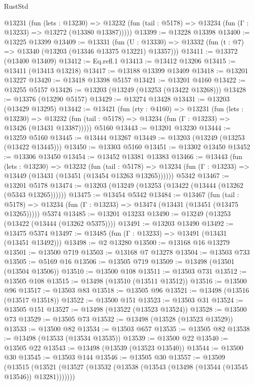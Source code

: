 \begin{lexlean}{RustStd}
\begin{coremodule}
    @13231
      (fun (lets : @13230) =>
      @13232 (fun (tail : @5178) => @13234 (fun (Γ : @13233) => @13272 (@13380 @13387)))))
@13399 := @13228 @13398
@13400 := @13225 @13399
@13409 := @13331
    (fun (U : @13330) => @13332 (fun (t : @7) => @13340 (@13203 (@13346 @13375 @13221) @13357)))
@13411 := @13372 (@13400 @13409)
@13412 := Eq.refl.{1}
@13413 := @13412 @13206
@13415 := @13411 (@13413 @13218)
@13417 := @13188 @13399 @13409
@13418 := @13201 @13227
@13420 := @13418 @13398 @5157
@13421 := @13201 @4160
@13422 := @13255 @5157
@13426 := @13203 (@13249 (@13253 (@13422 @13268)))
@13428 := @13376 (@13290 @5157)
@13429 := @13274 @13428
@13431 := @13203 (@13429 @13295)
@13442 := @13421
    (fun (rty : @4160) =>
    @13231
      (fun (lets : @13230) =>
      @13232 (fun (tail : @5178) => @13234 (fun (Γ : @13233) => @13426 (@13431 @13387)))))
    @5160
@13443 := @13201 @13230
@13444 := @13259 @5160
@13445 := @13444 @13267
@13449 := @13203 (@13249 (@13253 (@13422 @13445)))
@13450 := @13303 @5160
@13451 := @13302 @13450
@13452 := @13306 @13450
@13454 := @13452 @13381 @13383
@13466 := @13443
    (fun (lets : @13230) =>
    @13232
      (fun (tail : @5178) =>
      @13234 (fun (Γ : @13233) => @13449 (@13431 (@13451 (@13454 @13263 @13265))))))
    @5342
@13467 := @13201 @5178
@13474 := @13203 (@13249 (@13253 (@13422 (@13444 (@13262 (@5343 @13265))))))
@13475 := @13454 @5342
@13484 := @13467
    (fun (tail : @5178) => @13234 (fun (Γ : @13233) => @13474 (@13431 (@13451 (@13475 @13265)))))
    @5374
@13485 := @13201 @13233
@13490 := @13249 (@13253 (@13422 (@13444 (@13262 @5375))))
@13491 := @13203 @13490
@13492 := @13475 @5374
@13497 := @13485 (fun (Γ : @13233) => @13491 (@13431 (@13451 @13492)))
@13498 := @2 @13280
@13500 := @13168 @16 @13279
@13501 := @13500 @719
@13503 := @13168 @7 @13278
@13504 := @13503 @733
@13505 := @5169 @16
@13506 := @13505 @719
@13509 := @13498 (@13501 (@13504 @13506))
@13510 := @13500 @108
@13511 := @13503 @731
@13512 := @13505 @108
@13515 := @13498 (@13510 (@13511 @13512))
@13516 := @13500 @96
@13517 := @13503 @83
@13518 := @13505 @96
@13521 := @13498 (@13516 (@13517 @13518))
@13522 := @13500 @151
@13523 := @13503 @31
@13524 := @13505 @151
@13527 := @13498 (@13522 (@13523 @13524))
@13528 := @13500 @73
@13529 := @13505 @73
@13532 := @13498 (@13528 (@13523 @13529))
@13533 := @13500 @82
@13534 := @13503 @657
@13535 := @13505 @82
@13538 := @13498 (@13533 (@13534 @13535))
@13539 := @13500 @22
@13540 := @13505 @22
@13543 := @13498 (@13539 (@13523 @13540))
@13544 := @13500 @30
@13545 := @13503 @144
@13546 := @13505 @30
@13557 := @13509
    (@13515 (@13521 (@13527 (@13532 (@13538 (@13543 (@13498 (@13544 (@13545 @13546)) @13281)))))))

\end{coremodule}
\end{lexlean}
